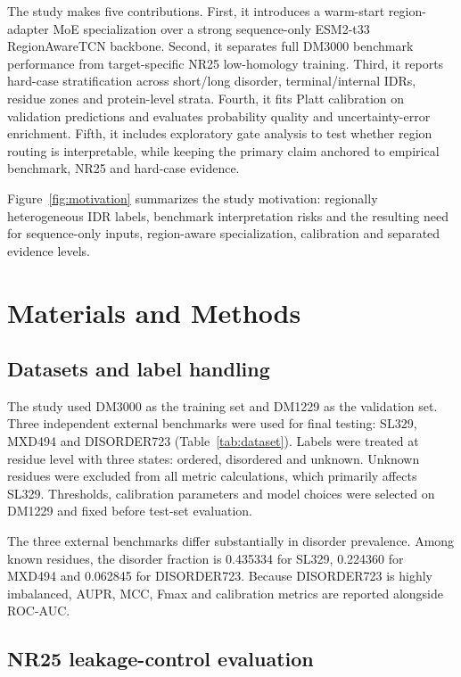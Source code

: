 \documentclass[namedate,webpdf,traditional,large]{oup-authoring-template}
\newcommand{\backbone}{RegionAwareTCN}
\begin{document}
The study makes five contributions. First, it introduces a warm-start region-adapter MoE specialization over a strong sequence-only ESM2-t33 \backbone{} backbone. Second, it separates full DM3000 benchmark performance from target-specific NR25 low-homology training. Third, it reports hard-case stratification across short/long disorder, terminal/internal IDRs, residue zones and protein-level strata. Fourth, it fits Platt calibration on validation predictions and evaluates probability quality and uncertainty-error enrichment. Fifth, it includes exploratory gate analysis to test whether region routing is interpretable, while keeping the primary claim anchored to empirical benchmark, NR25 and hard-case evidence.

Figure~\ref{fig:motivation} summarizes the study motivation: regionally heterogeneous IDR labels, benchmark interpretation risks and the resulting need for sequence-only inputs, region-aware specialization, calibration and separated evidence levels.

\section{Materials and Methods}

\subsection{Datasets and label handling}

The study used DM3000 as the training set and DM1229 as the validation set. Three independent external benchmarks were used for final testing: SL329, MXD494 and DISORDER723 (Table~\ref{tab:dataset}). Labels were treated at residue level with three states: ordered, disordered and unknown. Unknown residues were excluded from all metric calculations, which primarily affects SL329. Thresholds, calibration parameters and model choices were selected on DM1229 and fixed before test-set evaluation.

The three external benchmarks differ substantially in disorder prevalence. Among known residues, the disorder fraction is 0.435334 for SL329, 0.224360 for MXD494 and 0.062845 for DISORDER723. Because DISORDER723 is highly imbalanced, AUPR, MCC, Fmax and calibration metrics are reported alongside ROC-AUC.

\subsection{NR25 leakage-control evaluation}
\end{document}
